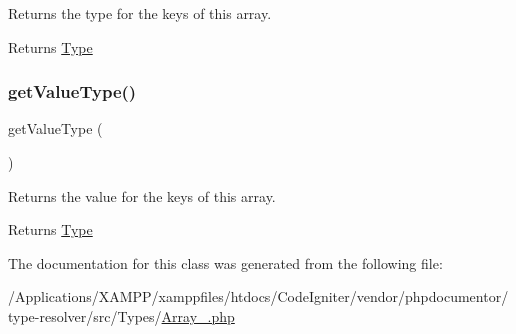 Returns the type for the keys of this array.

\begin{DoxyReturn}{Returns}
\mbox{\hyperlink{interfacephp_documentor_1_1_reflection_1_1_type}{Type}} 
\end{DoxyReturn}
\mbox{\label{classphp_documentor_1_1_reflection_1_1_types_1_1_array___a54471d3ffde79f0dd0f32938c36f75df}} 
\subsubsection{\texorpdfstring{get\+Value\+Type()}{getValueType()}}
{\footnotesize\ttfamily get\+Value\+Type (\begin{DoxyParamCaption}{ }\end{DoxyParamCaption})}

Returns the value for the keys of this array.

\begin{DoxyReturn}{Returns}
\mbox{\hyperlink{interfacephp_documentor_1_1_reflection_1_1_type}{Type}} 
\end{DoxyReturn}


The documentation for this class was generated from the following file\+:\begin{DoxyCompactItemize}
\item 
/\+Applications/\+X\+A\+M\+P\+P/xamppfiles/htdocs/\+Code\+Igniter/vendor/phpdocumentor/type-\/resolver/src/\+Types/\mbox{\hyperlink{_array___8php}{Array\+\_\+.\+php}}\end{DoxyCompactItemize}
